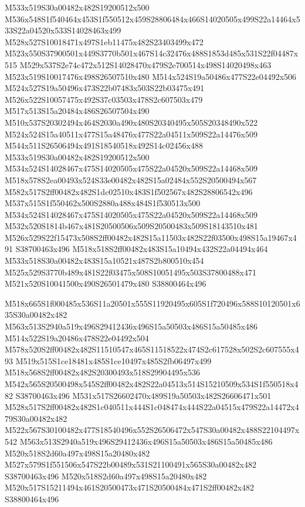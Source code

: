 \documentclass{article}
\begin{document}
\begin{multicols}{2}
M533x519S30a00482x482S19200512x500 M536x548S1f540464x453S1f550512x459S28806484x466S14020505x499S22a14464x533S22a04520x533S14028463x499 M528x527S10018471x497S1eb11475x482S23403499x472 M523x550S37900501x449S3770b501x467S14c32476x488S1853d485x531S22f04487x515 M529x537S2e74c472x512S14028470x479S2e700514x498S14020498x463 M523x519S10017476x498S26507510x480 M514x524S19a50486x477S22e04492x506 M524x527S19a50496x473S22b07483x503S22b03475x491 M526x522S10057475x492S37c03503x478S2c607503x479 M517x513S15a20484x486S26507504x490 M510x537S20302494x464S2030a490x480S20340495x505S20348490x522 M524x524S15a40511x477S15a48476x477S22a04511x509S22a14476x509 M544x511S26506494x491S18540518x492S14c02456x488 M533x519S30a00482x482S19200512x500 M534x524S14028467x475S14020505x475S22a04520x509S22a14468x509 M518x578S2ea00493x524S33e00482x482S15a02484x552S20500494x567 M582x517S2ff00482x482S1dc02510x483S1f502567x482S28806542x496 M537x515S1f550462x500S2880a488x484S1f530513x500 M534x524S14028467x475S14020505x475S22a04520x509S22a14468x509 M532x520S1814b467x481S20500506x509S20500483x509S18143510x481 M526x529S22f15473x508S2ff00482x482S15a11503x482S22f03500x498S15a19467x491 S38700463x496 M518x518S2ff00482x483S15a10494x432S22a04494x464 M533x518S30a00482x483S15a10521x487S2b800510x454 M525x529S3770b489x481S22f03475x508S10051495x503S37800488x471 M521x520S10041500x490S26501479x480 S38800464x496

M518x665S1f000485x536S11a20501x555S11920495x605S1f720496x588S10120501x635S30a00482x482 M563x513S2940a519x496S29412436x496S15a50503x486S15a50485x486 M514x522S19a20486x478S22e04492x504 M578x520S2ff00482x482S11510547x465S11518522x474S2c617528x502S2c607555x493 M519x515S1ce18481x485S1ce10497x485S2fb06497x499 M518x568S2ff00482x482S20300493x518S29904495x536 M542x565S20500498x545S2ff00482x482S22a04513x514S15210509x534S1f550518x482 S38700463x496 M531x517S26602470x489S19a50503x482S26606471x501 M528x517S2ff00482x482S1c040511x444S1c048474x444S22a04515x479S22a14472x479S30a00482x482 M522x567S30100482x477S18540496x552S26506472x547S30a00482x488S22104497x542 M563x513S2940a519x496S29412436x496S15a50503x486S15a50485x486 M520x518S2d60a497x498S15a20480x482 M527x579S1f551506x547S22b00489x531S21100491x565S30a00482x482 S38700463x496 M520x518S2d60a497x498S15a20480x482 M520x517S15211494x461S20500473x471S20500484x471S2ff00482x482 S38800464x496


\end{multicols}
\end{document}
